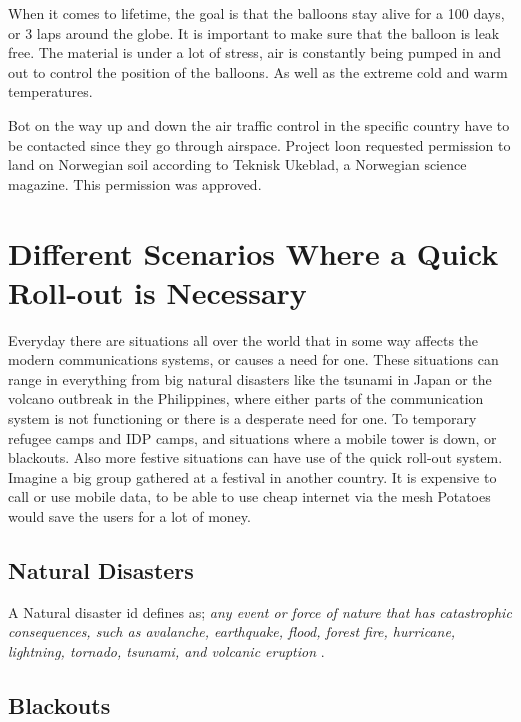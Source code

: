 When it comes to lifetime, the goal is that the balloons stay alive for a 100 days, or 3 laps around the globe. It is important to make sure that the balloon is leak free. The material is under a lot of stress, air is constantly being pumped in and out to control the position of the balloons. As well as the extreme cold and warm temperatures. 

Bot on the way up and down the air traffic control in the specific country have to be contacted since they go through airspace. Project loon requested permission to land on Norwegian soil according to Teknisk Ukeblad, a Norwegian science magazine. This permission was approved. \cite{loonTU}

\section{Different Scenarios Where a Quick Roll-out is Necessary}

Everyday there are situations all over the world that in some way affects the modern communications systems, or causes a need for one. These situations can range in everything from big natural disasters like the tsunami in Japan or the volcano outbreak in the Philippines, where either parts of the communication system is not functioning or there is a desperate need for one. To temporary refugee camps and IDP camps, and situations where a mobile tower is down, or blackouts. Also more festive situations can have use of the quick roll-out system. Imagine a big group gathered at a festival in another country. It is expensive to call or use mobile data, to be able to use cheap internet via the mesh Potatoes would save the users for a lot of money. 

\subsection{Natural Disasters}
A Natural disaster id defines as; \textit{any event or force of nature that has catastrophic consequences, such as avalanche, earthquake, flood, forest fire, hurricane, lightning, tornado, tsunami, and volcanic eruption} \cite{naturalDisaster}.


\subsection{Blackouts}

